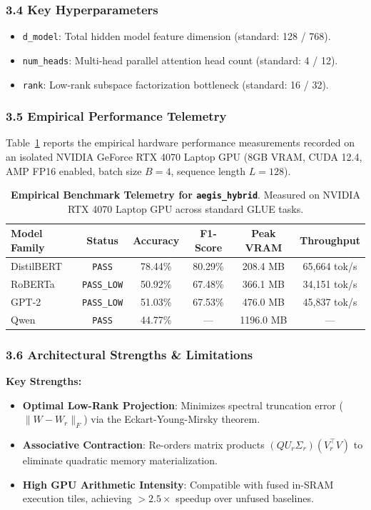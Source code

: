 \subsubsection*{3.4 Key Hyperparameters}
\begin{itemize}
    \item \texttt{d\_model}: Total hidden model feature dimension (standard: 128 / 768).
    \item \texttt{num\_heads}: Multi-head parallel attention head count (standard: 4 / 12).
    \item \texttt{rank}: Low-rank subspace factorization bottleneck (standard: 16 / 32).
\end{itemize}

\subsubsection*{3.5 Empirical Performance Telemetry}
Table~\ref{tab:telemetry_aegis_hybrid} reports the empirical hardware performance measurements recorded on an isolated NVIDIA GeForce RTX 4070 Laptop GPU (8GB VRAM, CUDA 12.4, AMP FP16 enabled, batch size $B=4$, sequence length $L=128$).

\begin{table}[h]
\centering
\small
\caption{\textbf{Empirical Benchmark Telemetry for \texttt{aegis\_hybrid}}. Measured on NVIDIA RTX 4070 Laptop GPU across standard GLUE tasks.}
\label{tab:telemetry_aegis_hybrid}
\begin{tabular*}{\columnwidth}{@{\extracolsep{\fill}}lccccc}
\toprule
\textbf{Model Family} & \textbf{Status} & \textbf{Accuracy} & \textbf{F1-Score} & \textbf{Peak VRAM} & \textbf{Throughput} \\
\midrule
DistilBERT & \texttt{PASS} & 78.44\% & 80.29\% & 208.4 MB & 65,664 tok/s \\
RoBERTa & \texttt{PASS\_LOW} & 50.92\% & 67.48\% & 366.1 MB & 34,151 tok/s \\
GPT-2 & \texttt{PASS\_LOW} & 51.03\% & 67.53\% & 476.0 MB & 45,837 tok/s \\
Qwen & \texttt{PASS} & 44.77\% & --- & 1196.0 MB & --- \\
\bottomrule
\end{tabular*}
\end{table}

\subsubsection*{3.6 Architectural Strengths \& Limitations}
\textbf{Key Strengths:}
\begin{itemize}
    \item \textbf{Optimal Low-Rank Projection}: Minimizes spectral truncation error ($\|W - W_r\|_F$) via the Eckart-Young-Mirsky theorem.
    \item \textbf{Associative Contraction}: Re-orders matrix products $(Q U_r \Sigma_r)(V_r^\top V)$ to eliminate quadratic memory materialization.
    \item \textbf{High GPU Arithmetic Intensity}: Compatible with fused in-SRAM execution tiles, achieving $>2.5\times$ speedup over unfused baselines.
\end{itemize}

